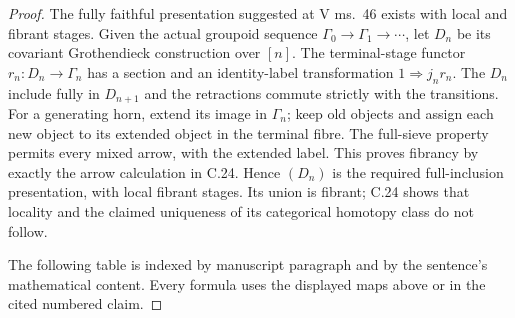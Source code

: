 \begin{proof}
The fully faithful presentation suggested at V ms.~46 exists
with local and fibrant stages. Given the actual groupoid sequence
$\Gamma_0\to\Gamma_1\to\cdots$, let $D_n$ be its covariant
Grothendieck construction over $[n]$. The terminal-stage functor
$r_n:D_n\to\Gamma_n$ has a section and an identity-label
transformation $1\Rightarrow j_nr_n$. The $D_n$ include fully
in $D_{n+1}$ and the retractions commute strictly with the
transitions. For a generating horn, extend its image in
$\Gamma_n$; keep old objects and assign each new object to its
extended object in the terminal fibre. The full-sieve property
permits every mixed arrow, with the extended label. This proves
fibrancy by exactly the arrow calculation in C.24. Hence $(D_n)$
is the required full-inclusion presentation, with local fibrant
stages. Its union is fibrant; C.24 shows that locality and the
claimed uniqueness of its categorical homotopy class do not follow.

The following table is indexed by manuscript paragraph and by the
sentence's mathematical content. Every formula uses the displayed
maps above or in the cited numbered claim.


\end{proof}
